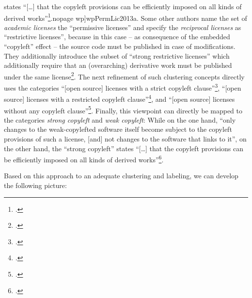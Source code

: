 states \enquote{[\ldots] that the copyleft provisions can be efficiently imposed
on all kinds of derived works}\footcite[cf.][\nopage wp]{wpCopyleft2013a}.nopage
wp]{wpPermLic2013a}. Some other authors name the set of \emph{academic licenses}
the \enquote{permissive licenses} and specify the \emph{reciprocal licenses} as
\enquote{restrictive licenses}, because in this case -- as consequence of the
embedded \enquote{copyleft} effect -- the source code must be published in case
of modifications. They additionally introduce the subset of \enquote{strong
restrictive licenses} which additionally require that an (overarching)
derivative work must be published under the same license\footcite[pars pro toto
cf.][57]{Buchtala2007a}. The next refinement of such clustering concepts
directly uses the categories \enquote{[open source] licenses with a strict
copyleft clause}\footcite[Originally stated as \enquote{Lizenzen mit einer
strengen Copyleft-Klausel}. Cf.][24]{JaeMet2011a}, \enquote{[open source]
licenses with a restricted copyleft clause}\footcite[Originally stated as
\enquote{Lizenzen mit einer beschränkten Copyleft-Klausel}.
Cf.][71]{JaeMet2011a}, and \enquote{[open source] licenses without any copyleft
clause}\footcite[Originally stated as \enquote{Lizenzen ohne Copyleft-Klausel}.
Cf.][83]{JaeMet2011a}. Finally, this viewpoint can directly be mapped to the
categories \emph{strong copyleft} and \emph{weak copyleft}: While on the one
hand, \enquote{only changes to the weak-copylefted software itself become
subject to the copyleft provisions of such a license, [and] not changes to the
software that links to it}, on the other hand, the \enquote{strong copyleft}
states \enquote{[\ldots] that the copyleft provisions can be efficiently imposed
on all kinds of derived works}\footcite[cf.][\nopage wp]{wpCopyleft2013a}.

Based on this approach to an adequate clustering and labeling, we can develop
the following picture:

